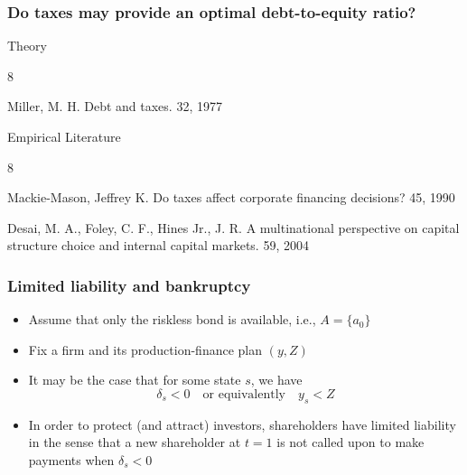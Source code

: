 \documentclass[blue]{beamer}
\theoremstyle{definition}
\theoremstyle{example}
\begin{document}
\begin{frame}\frametitle{Do taxes may provide an optimal debt-to-equity ratio?}



\begin{block}{Theory}
\begin{thebibliography}{8}

  \beamertemplatearticlebibitems

    Miller, M. H.
    \newblock Debt and taxes.
     32, 1977

    \end{thebibliography}
\end{block}

\begin{block}{Empirical Literature}


\begin{thebibliography}{8}

    \beamertemplatearticlebibitems

    Mackie-Mason, Jeffrey K.
    \newblock Do taxes affect corporate financing decisions?
     45, 1990

    Desai, M. A., Foley, C. F., Hines Jr., J. R.
    \newblock A multinational perspective on capital structure choice and internal capital markets.
     59, 2004

    \end{thebibliography}
\end{block}

\end{frame}


\begin{frame}\frametitle{Limited liability and bankruptcy}

\begin{itemize}
\item Assume that only the riskless bond is available, i.e., $A=\{a_0\}$
\item Fix a firm and its production-finance plan $(y,Z)$
\item It may be the case that for some state $s$, we have
\[
\delta_s <0 \quad \textrm{or equivalently} \quad y_s < Z
\]
\item In order to protect (and attract) investors, shareholders have \alert{limited liability} in the sense that a new shareholder at $t=1$ is not called upon to
make payments when $\delta_s <0$
\end{itemize}
\end{frame}
\end{document}
